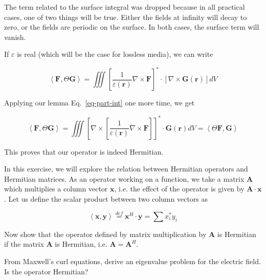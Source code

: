 The term related to the surface integral was dropped because in all practical cases, one of two things will be true. Either the fields at infinity will decay to zero, or the fields are periodic on the surface. In both cases, the surface term will vanish.

If $\varepsilon$ is real (which will be the case for lossless media), we can write

\begin{equation}
\left\langle {\mathbf F}, \Theta {\mathbf G}\right\rangle = \iiint \left [\frac{1}{\varepsilon({\mathbf r})} \nabla \times {\mathbf F}\right]^* \cdot \left[ \nabla \times {\mathbf G({\mathbf r})}  \right ] dV 
\end{equation} 

Applying our lemma Eq.~\ref{eq-part-int} one more time, we get

\begin{equation}
\left\langle {\mathbf F}, \Theta {\mathbf G}\right\rangle = \iiint \left[ \nabla \times  \left [\frac{1}{\varepsilon({\mathbf r})} \nabla \times {\mathbf F}\right] \right ] ^* \cdot {\mathbf G({\mathbf r})}  dV  = \left\langle \Theta {\mathbf F}, {\mathbf G}\right\rangle 
\end{equation} 

This proves that our operator is indeed Hermitian.

\begin{exer}
In this exercise, we will explore the relation between Hermitian operators and Hermitian matrices. As an operator working on a function, we take a matrix ${\mathbf A}$ which multiplies a column vector ${\mathbf x}$, i.e. the effect of the operator is given by ${\mathbf A} \cdot {\mathbf x}$. Let us define the scalar product between two column vectors as

$$\left\langle {\mathbf x},{\mathbf y} \right\rangle \stackrel{def}{=} {\mathbf x}^H \cdot {\mathbf y} = \sum{x_i^* y_i}$$

Now show that the operator defined by matrix multiplication by ${\mathbf A}$ is Hermitian if the matrix ${\mathbf A}$ is Hermitian, i.e. ${\mathbf A} = {\mathbf A}^H$.
\end{exer}


\begin{exer}
From Maxwell's curl equations, derive an eigenvalue problem for the electric field. Is the operator Hermitian?
\end{exer}


